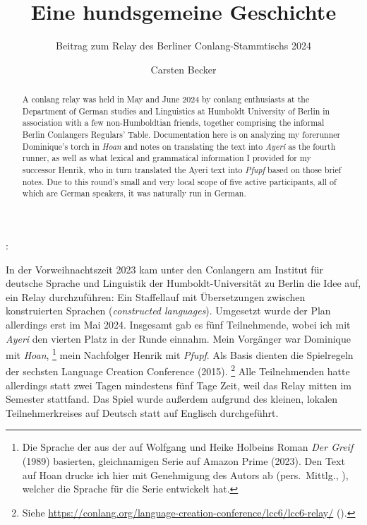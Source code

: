 \documentclass[
	12pt,
	ngerman,
]{scrartcl}
\author{Carsten Becker}
\title{Eine hundsgemeine Geschichte}
\subtitle{Beitrag zum Relay des Berliner Conlang-Stammtischs 2024}
\date{\DTMdate{2024-06-08}} %
\let\q\textquote
\newcommand{\fw}[1]{\textit{#1}} %
\newcommand{\tit}[1]{\textit{#1}} %
\newenvironment{mytitle}{
	\hfill
	\begin{minipage}{0.667\textwidth}
	\vspace{\baselineskip}
	\begin{center}
		\Large
		\sffamily\bfseries
		\makeatletter
}{
		\makeatother
	\end{center}
	\vspace{1em}
	\end{minipage}
	\hfill
}
\begin{document}

\begin{mytitle}
	\@title: \@subtitle
\end{mytitle}

\begin{abstract}
A conlang relay was held in May and June 2024 by conlang enthusiasts at the
Department of German studies and Linguistics at Humboldt University of Berlin
in association with a few non-Humboldtian friends, together comprising the
informal Berlin Conlangers Regulars' Table. Documentation here is on analyzing
my forerunner Dominique's torch in \tit{Hoan} and notes on translating the text
into \tit{Ayeri} as the fourth runner, as well as what lexical and grammatical
information I provided for my successor Henrik, who in turn translated the
Ayeri text into \tit{Pfupf} based on those brief notes. Due to this round's
small and very local scope of five active participants, all of which are German
speakers, it was naturally run in German.
\end{abstract}

In der Vorweihnachtszeit 2023 kam unter den Conlangern am Institut für deutsche
Sprache und Linguistik der Humboldt-Universität zu Berlin die Idee auf, ein
Relay durchzuführen: Ein Staffellauf mit Übersetzungen zwischen konstruierten
Sprachen (\fw{constructed languages}). Umgesetzt wurde der Plan allerdings erst
im Mai 2024. Insgesamt gab es fünf Teilnehmende, wobei ich mit \tit{Ayeri} den
vierten Platz in der Runde einnahm. Mein Vorgänger war Dominique mit
\tit{Hoan},%
%
	\footnote{Die Sprache der \q{Gehörnten} aus der auf Wolfgang und Heike
	Holbeins Roman \tit{Der Greif} (1989) basierten, gleichnamigen Serie auf
	Amazon Prime (2023). Den Text auf Hoan drucke ich hier mit Genehmigung des
	Autors ab (pers.~Mittlg., ), welcher die Sprache für
	die Serie entwickelt hat.}
%
mein Nachfolger Henrik mit \tit{Pfupf}. Als Basis dienten die Spielregeln der
sechsten Language Creation Conference (2015).%
%
	\footnote{Siehe
	\url{https://conlang.org/language-creation-conference/lcc6/lcc6-relay/}
	().}
%
Alle Teilnehmenden hatte allerdings statt zwei Tagen mindestens fünf Tage Zeit,
weil das Relay mitten im Semester stattfand. Das Spiel wurde außerdem aufgrund
des kleinen, lokalen Teilnehmerkreises auf Deutsch statt auf Englisch
durchgeführt.

\end{document}
